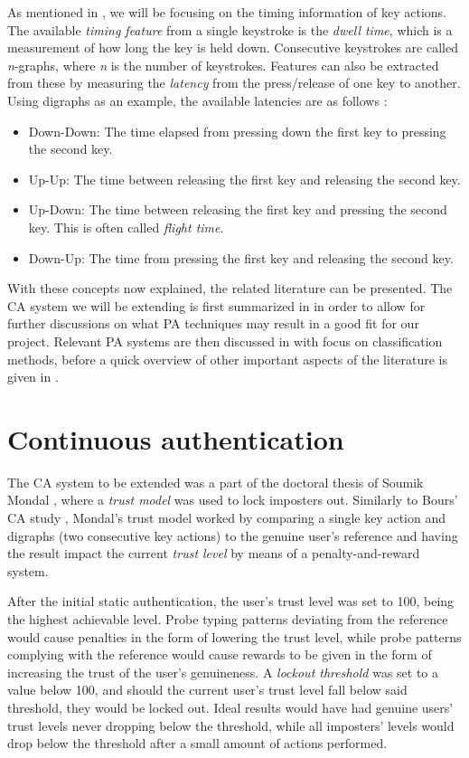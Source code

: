 \documentclass[informationsecurity]{gucmasterproject}
\begin{document}
As mentioned in , we will be focusing on the timing information of key actions.
The available \textit{timing feature} from a single keystroke is the \textit{dwell time}, which is a measurement of how long the key is held down.
Consecutive keystrokes are called \textit{n}-graphs, where \textit{n} is the number of keystrokes.
Features can also be extracted from these by measuring the \textit{latency} from the press/release of one key to another.
Using digraphs as an example, the available latencies are as follows \cite{mondal}:
\begin{itemize}
    \item Down-Down: The time elapsed from pressing down the first key to pressing the second key.
    \item Up-Up: The time between releasing the first key and releasing the second key.
    \item Up-Down: The time between releasing the first key and pressing the second key. This is often called \textit{flight time}.
    \item Down-Up: The time from pressing the first key and releasing the second key.
\end{itemize}

With these concepts now explained, the related literature can be presented.
The CA system we will be extending is first summarized in  in order to allow for further discussions on what PA techniques may result in a good fit for our project.
Relevant PA systems are then discussed in  with focus on classification methods, before a quick overview of other important aspects of the literature is given in .

\section{Continuous authentication}
\label{sec:related-CA}
The CA system to be extended was a part of the doctoral thesis of Soumik Mondal \cite{mondal}, where a \textit{trust model} was used to lock imposters out.
Similarly to Bours' CA study \cite{BOURS201236}, Mondal's trust model worked by comparing a single key action and digraphs (two consecutive key actions) to the genuine user's reference and having the result impact the current \textit{trust level} by means of a penalty-and-reward system.

After the initial static authentication, the user's trust level was set to 100, being the highest achievable level.
Probe typing patterns deviating from the reference would cause penalties in the form of lowering the trust level, while probe patterns complying with the reference would cause rewards to be given in the form of increasing the trust of the user's genuineness.
A \textit{lockout threshold} was set to a value below 100, and should the current user's trust level fall below said threshold, they would be locked out.
Ideal results would have had genuine users' trust levels never dropping below the threshold, while all imposters' levels would drop below the threshold after a small amount of actions performed.
\end{document}
